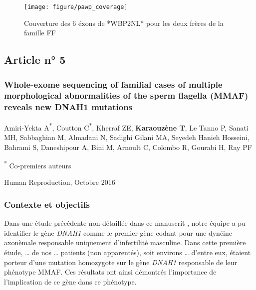 \documentclass[12pt,twoside]{reedthesis}
\theoremstyle{definition}
\theoremstyle{definition}
\theoremstyle{remark}
\begin{document}
  \begin{figure}
  
  {\centering \texttt{[image: figure/pawp\_coverage]} 
  
  }
  
  \caption[Couverture des 6 éxons de *WBP2NL* pour les deux frères de la famille FF]{Couverture des 6 éxons de *WBP2NL* pour les deux frères de la famille FF}\label{fig:plotcovplcz}
  \end{figure}
  
  \newpage
  
  \subsection{Article n° 5}\label{article-n-5}
  
  \subsubsection{Whole-exome sequencing of familial cases of multiple
  morphological abnormalities of the sperm flagella (MMAF) reveals new
  DNAH1
  mutations}\label{whole-exome-sequencing-of-familial-cases-of-multiple-morphological-abnormalities-of-the-sperm-flagella-mmaf-reveals-new-dnah1-mutations}
  
  Amiri-Yekta A\textsuperscript{*}, Coutton C\textsuperscript{*}, Kherraf
  ZE, \textbf{Karaouzène T}, Le Tanno P, Sanati MH, Sabbaghian M, Almadani
  N, Sadighi Gilani MA, Seyedeh Hanieh Hosseini, Bahrami S, Daneshipour A,
  Bini M, Arnoult C, Colombo R, Gourabi H, Ray PF
  
  \textsuperscript{*} Co-premiers auteurs
  
  Human Reproduction, Octobre 2016
  
  \newpage
  
  \subsubsection{Contexte et objectifs}\label{contexte-et-objectifs-2}
  
  Dans une étude précédente non détaillée dans ce manuscrit , notre équipe
  a pu identifier le gène \emph{DNAH1} comme le premier gène codant pour
  une dynéine axonèmale responsable uniquement d'infertilité masculine.
  Dans cette première étude, \ldots{} de nos \ldots{} patients (non
  apparentés), soit environs \ldots{} d'entre eux, étaient porteur d'une
  mutation homozygote sur le gène \emph{DNAH1} responsable de leur
  phénotype MMAF. Ces résultats ont ainsi démontrés l'importance de
  l'implication de ce gène dans ce phénotype.
  
\end{document}
